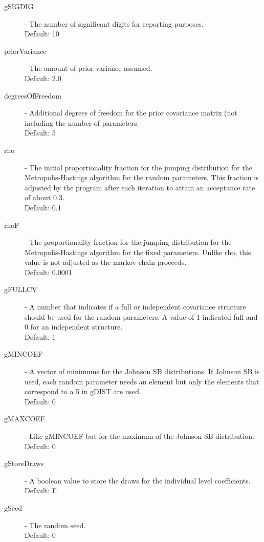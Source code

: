 \documentclass{article}\usepackage{graphicx, color}
\begin{document}
\begin{description}
\item[gSIGDIG] - The number of significant digits for reporting purposes.\\ 
Default: 10

\item[priorVariance] - The amount of prior variance assumed.\\ 
Default: 2.0

\item[degreesOfFreedom] - Additional degrees of freedom for the prior covariance matrix (not including the number of parameters.\\ 
Default: 5

\item[rho] - The initial proportionality fraction for the jumping distribution for the Metropolis-Hastings algorithm for the random parameters. This fraction is adjusted by the program after each iteration to attain an acceptance rate of about 0.3.\\ 
Default: 0.1

\item[rhoF] - The proportionality fraction for the jumping distribution for the Metropolis-Hastings algorithm for the fixed parameters. Unlike rho, this value is not adjusted as the markov chain proceeds. \\
Default: 0.0001

\item[gFULLCV] - A number that indicates if a full or independent covariance structure should be used for the random parameters. A value of 1 indicated full and 0 for an independent structure.\\ Default: 1

\item[gMINCOEF] - A vector of minimums for the Johnson SB distributions. If Johnson SB is used, each random parameter needs an element but only the elements that correspond to a 5 in gDIST are used. \\ 
Default: 0

\item[gMAXCOEF] - Like gMINCOEF but for the maximum of the Johnson SB distribution. 
\\ Default: 0

\item[gStoreDraws] - A boolean value to store the draws for the individual level coefficients. \\ Default: F

\item[gSeed] - The random seed.\\ 
Default: 0


\end{description}
\end{document}
